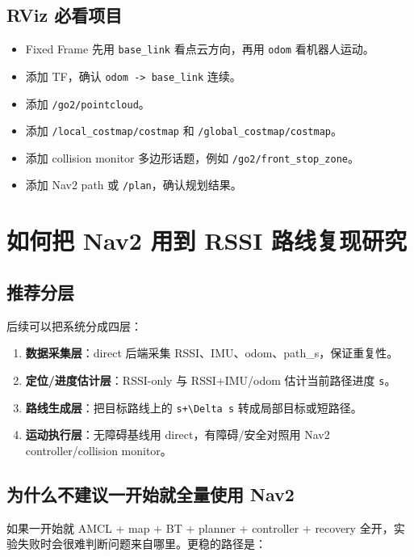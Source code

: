 \documentclass[UTF8,11pt,a4paper,openany]{ctexrep}
\newcommand{\code}[1]{\nolinkurl{#1}}
\newcommand{\topic}[1]{\nolinkurl{#1}}
\begin{document}
\section{RViz 必看项目}

\begin{itemize}
  \item Fixed Frame 先用 \code{base_link} 看点云方向，再用 \code{odom} 看机器人运动。
  \item 添加 TF，确认 \code{odom -> base_link} 连续。
  \item 添加 \topic{/go2/pointcloud}。
  \item 添加 \topic{/local_costmap/costmap} 和 \topic{/global_costmap/costmap}。
  \item 添加 collision monitor 多边形话题，例如 \topic{/go2/front_stop_zone}。
  \item 添加 Nav2 path 或 \topic{/plan}，确认规划结果。
\end{itemize}

\chapter{如何把 Nav2 用到 RSSI 路线复现研究}

\section{推荐分层}

后续可以把系统分成四层：

\begin{enumerate}
  \item \textbf{数据采集层}：direct 后端采集 RSSI、IMU、odom、path\_s，保证重复性。
  \item \textbf{定位/进度估计层}：RSSI-only 与 RSSI+IMU/odom 估计当前路径进度 \code{s}。
  \item \textbf{路线生成层}：把目标路线上的 \code{s+\Delta s} 转成局部目标或短路径。
  \item \textbf{运动执行层}：无障碍基线用 direct，有障碍/安全对照用 Nav2 controller/collision monitor。
\end{enumerate}

\section{为什么不建议一开始就全量使用 Nav2}

如果一开始就 AMCL + map + BT + planner + controller + recovery 全开，实验失败时会很难判断问题来自哪里。更稳的路径是：
\end{document}
